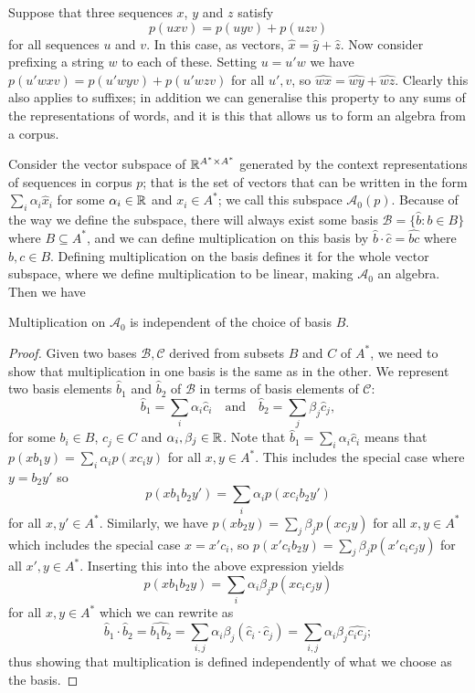 \documentclass[12pt]{report}
\begin{document}
Suppose that three sequences $x$, $y$ and $z$ satisfy
$$p(uxv) = p(uyv) + p(uzv)$$
for all sequences $u$ and $v$. In this case, as vectors, $\hat{x} = \hat{y} + \hat{z}$. Now consider prefixing a string $w$ to each of these. Setting $u = u'w$ we have $p(u'wxv) = p(u'wyv) + p(u'wzv)$ for all $u',v$, so $\widehat{wx} = \widehat{wy} + \widehat{wz}$. Clearly this also applies to suffixes; in addition we can generalise this property to any sums of the representations of words, and it is this that allows us to form an algebra from a corpus.

Consider the vector subspace of $\mathbb{R}^{A^* \times A^*}$ generated by the context representations of sequences in corpus $p$; that is the set of vectors that can be written in the form $\sum_i \alpha_i \hat{x}_i$ for some $\alpha_i \in \mathbb{R}$  and $x_i \in A^*$; we call this subspace $\mathcal{A}_0(p)$. Because of the way we define the subspace, there will always exist some basis $\mathcal{B} = \{\hat{b} : b \in B\}$ where $B \subseteq A^*$, and we can define multiplication on this basis by $\hat{b}\cdot\hat{c} = \widehat{bc}$ where $b,c \in B$. Defining multiplication on the basis defines it for the whole vector subspace, where we define multiplication to be linear, making $\mathcal{A}_0$ an algebra.
Then we have
\begin{prop}
Multiplication on $\mathcal{A}_0$ is independent of the choice of basis $B$.
\end{prop}
\begin{proof}
Given two bases $\mathcal{B , C}$ derived from subsets $B$ and $C$ of $A^*$, we need to show that multiplication in one basis is the same as in the other. We represent two basis elements $\hat{b}_1$ and $\hat{b}_2$ of $\mathcal{B}$ in terms of basis elements of $\mathcal{C}$:
$$\hat{b}_1 = \sum_i \alpha_i \hat{c}_i \quad\text{and}\quad
\hat{b}_2 = \sum_j \beta_j \hat{c}_j,$$
for some $b_i \in B$, $c_j \in C$ and $\alpha_i, \beta_j  \in \mathbb{R}$.
Note that $\hat{b}_1 = \sum_i \alpha_i \hat{c}_i$ means that $p(xb_1y) = \sum_i \alpha_i p(xc_iy)$ for all $x,y \in A^*$. This includes the special case where $y = b_2y'$ so $$p(xb_1b_2y') = \sum_i \alpha_i p(xc_ib_2y')$$ for all $x, y' \in A^*$.
Similarly, we have $p(xb_2y) = \sum_j \beta_j p(xc_jy)$ for all $x,y \in A^*$ which includes the special case $x = x'c_i$, so $p(x'c_ib_2y) = \sum_j \beta_j p(x'c_ic_jy)$ for all $x',y \in A^*$. Inserting this into the above expression yields
$$p(xb_1b_2y) = \sum_i \alpha_i\beta_j p(xc_ic_jy)$$
for all $x,y \in A^*$ which we can rewrite as
$$\hat{b}_1\cdot\hat{b}_2 = \widehat{b_1b_2} = \sum_{i,j}\alpha_i\beta_j (\hat{c}_i\cdot\hat{c}_j)
= \sum_{i,j}\alpha_i\beta_j \widehat{c_ic_j};$$
thus showing that multiplication is defined independently of what we choose as the basis.
\end{proof}
\end{document}
